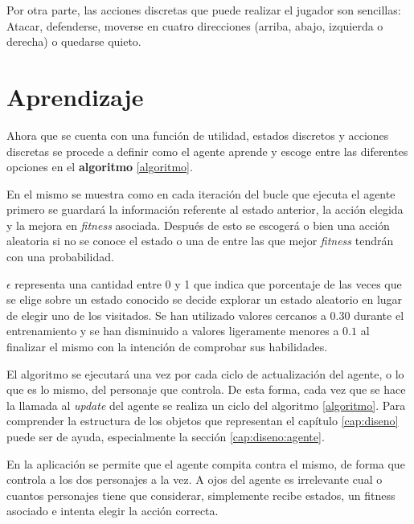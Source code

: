 \bigskip


\bigskip

Por otra parte, las acciones discretas que puede realizar el jugador son sencillas: Atacar, defenderse, moverse en cuatro direcciones (arriba, abajo, izquierda o derecha) o quedarse quieto.


\section{Aprendizaje}

Ahora que se cuenta con una función de utilidad, estados discretos y acciones discretas se procede a definir como el agente aprende y escoge entre las diferentes opciones en el \textbf{algoritmo} \ref{algoritmo}.

\bigskip


En el mismo se muestra como en cada iteración del bucle que ejecuta el agente primero se guardará la información referente al estado anterior, la acción elegida y la mejora en \textit{fitness} asociada. Después de esto se escogerá o bien una acción aleatoria si no se conoce el estado o una de entre las que mejor \textit{fitness} tendrán con una probabilidad.

\bigskip


\textbf{$\epsilon$} representa una cantidad entre 0 y 1 que indica que porcentaje de las veces que se elige sobre un estado conocido se decide explorar un estado aleatorio en lugar de  elegir uno de los visitados. Se han utilizado valores cercanos a $0.30$ durante el entrenamiento y se han disminuido a valores ligeramente menores a $0.1$ al finalizar el mismo con la intención de comprobar sus habilidades.

\bigskip

El algoritmo se ejecutará una vez por cada ciclo de actualización del agente, o lo que es lo mismo, del personaje que controla. De esta forma, cada vez que se hace la llamada al \textit{update} del agente se realiza un ciclo del algoritmo \ref{algoritmo}. Para comprender la estructura de los objetos que representan el capítulo \ref{cap:diseno} puede ser de ayuda, especialmente la sección \ref{cap:diseno:agente}.

\bigskip

En la aplicación se permite que el agente compita contra el mismo, de forma que controla a los dos personajes a la vez. A ojos del agente es irrelevante cual o cuantos personajes tiene que considerar, simplemente recibe estados, un fitness asociado e intenta elegir la acción correcta.

